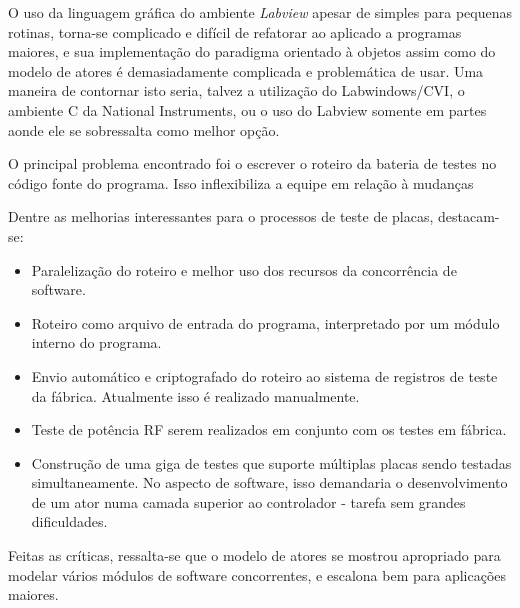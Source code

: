         O uso da linguagem gráfica do ambiente \textit{Labview} apesar de simples para pequenas rotinas, torna-se complicado e difícil de refatorar ao aplicado a programas maiores, e sua implementação do paradigma orientado à objetos assim como do modelo de atores é demasiadamente complicada e problemática de usar.
        Uma maneira de contornar isto seria, talvez a utilização do Labwindows\texttrademark/CVI, o ambiente C da National Instruments, ou o uso do Labview somente em partes aonde ele se sobressalta como melhor opção.
        
        O principal problema encontrado foi o escrever o roteiro da bateria de testes no código fonte do programa. Isso inflexibiliza a equipe em relação à mudanças
        
        Dentre as melhorias interessantes para o processos de teste de placas, destacam-se:
        \begin{itemize}
            \item Paralelização do roteiro e melhor uso dos recursos da concorrência de software.
            \item Roteiro como arquivo de entrada do programa, interpretado por um módulo interno do programa.
            \item Envio automático e criptografado do roteiro ao sistema de registros de teste da fábrica. Atualmente isso é realizado manualmente.
            \item Teste de potência RF serem realizados em conjunto com os testes em fábrica.
            \item Construção de uma giga de testes que suporte múltiplas placas sendo testadas simultaneamente. No aspecto de software, isso demandaria o desenvolvimento de um ator numa camada superior ao controlador - tarefa sem grandes dificuldades.
        \end{itemize}
        
        Feitas as críticas, ressalta-se que o modelo de atores se mostrou apropriado para modelar vários módulos de software concorrentes, e escalona bem para aplicações maiores. 
        